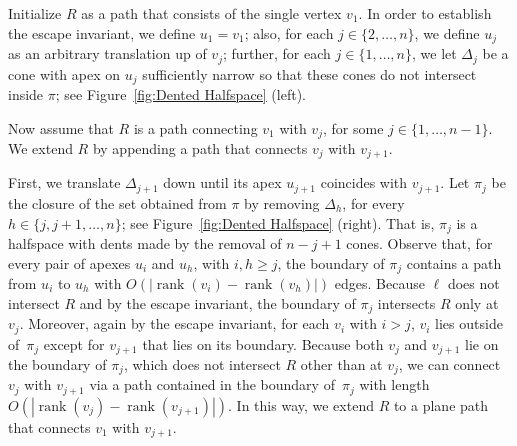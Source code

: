 \documentclass{patmorin}
\DeclareMathOperator{\rank}{rank}
\begin{document}
Initialize $R$ as a path that consists of the single vertex $v_1$. In order to establish the escape invariant, we define $u_1=v_1$; also, for each $j\in \{2,\dots,n\}$, we define $u_j$ as an arbitrary translation up of $v_j$; further, for each $j\in \{1,\dots,n\}$, we let $\Delta_j$ be a cone with apex on $u_j$ sufficiently narrow so that these cones do not intersect inside $\pi$; see Figure~\ref{fig:Dented Halfspace} (left).

Now assume that $R$ is a path connecting $v_1$ with $v_j$, for some $j\in \{1,\dots,n-1\}$. We extend $R$ by appending a
path that connects $v_j$ with $v_{j+1}$.

First, we translate $\Delta_{j+1}$ down until its apex $u_{j+1}$ coincides with $v_{j+1}$. Let $\pi_j$ be the closure of the set obtained from $\pi$ by removing $\Delta_h$, for every $h\in\{j,j+1,\ldots,n\}$; see Figure~\ref{fig:Dented Halfspace} (right). That is, $\pi_j$ is a halfspace with dents made by the removal of $n-j+1$ cones.
Observe that, for every pair of apexes $u_i$ and $u_h$, with $i,h\geq j$, the boundary of $\pi_j$
contains a path from $u_i$ to $u_h$ with $O(|\rank(v_i)-\rank(v_h)|)$ edges.
Because $\ell$ does not intersect $R$ and by the escape invariant, the boundary of $\pi_j$ intersects $R$ only at $v_j$. Moreover, again by the escape invariant, for each $v_i$ with $i > j$, $v_i$ lies outside of~$\pi_j$ except for $v_{j+1}$ that lies on its boundary. Because both $v_j$ and $v_{j+1}$ lie on the boundary of $\pi_j$, which does not intersect $R$ other than at $v_j$, we can connect $v_j$ with $v_{j+1}$ via a path contained in the boundary of~$\pi_j$ with length $O(|\rank(v_j) - \rank(v_{j+1})|)$. In this way, we extend $R$ to a plane path that connects $v_1$ with $v_{j+1}$.
\end{document}
